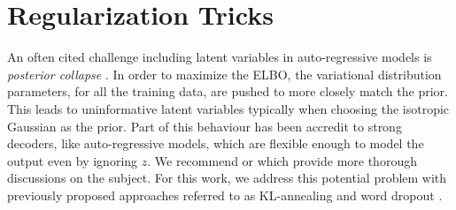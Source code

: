 








\section{Regularization Tricks}




An often cited challenge including latent variables in auto-regressive models is  \textit{posterior collapse} \cite{he2018lagging}. In order to maximize the \ac{ELBO}, the variational distribution parameters, for all the training data, are pushed to more closely match the prior. This leads to uninformative latent variables typically when choosing the isotropic Gaussian as the prior. Part of this behaviour has been accredit to strong decoders, like auto-regressive models, which are flexible enough to model the output even by ignoring $z$. We recommend \citet{chen2016VariationalLossyAE} or \citet{zhao2017InfoVAE} which provide more thorough discussions on the subject. For this work, we address this potential problem with previously proposed approaches referred to as KL-annealing \cite{bowman2015GeneratingSent,sonderby2016LadderVAE} and word dropout \cite{bowman2015GeneratingSent}.

